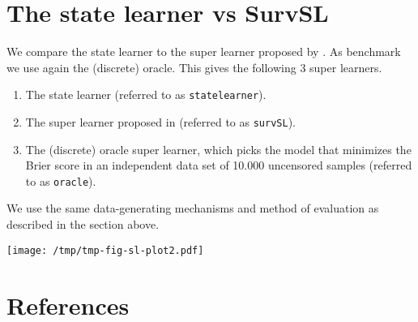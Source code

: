 \documentclass[a4paper,danish]{article}
\begin{document}
\clearpage 


\section{The state learner vs SurvSL}
\label{sec:org09707c3}

We compare the state learner to the super learner proposed by
\cite{westling2021inference}. As benchmark we use again the (discrete) oracle.
This gives the following 3 super learners.


\begin{enumerate}
\item The state learner (referred to as \texttt{statelearner}).
\item The super learner proposed in \citep{westling2021inference} (referred to as
\texttt{survSL}).
\item The (discrete) oracle super learner, which picks the model that minimizes the
Brier score in an independent data set of 10.000 uncensored samples (referred to
as \texttt{oracle}).
\end{enumerate}

We use the same data-generating mechanisms and method of evaluation as described
in the section above.

\begin{center}
\texttt{[image: /tmp/tmp-fig-sl-plot2.pdf]}
\end{center}




\section{References}
\label{sec:orgdc8dbd8}
\renewcommand{\section}[2]{} 

\end{document}
